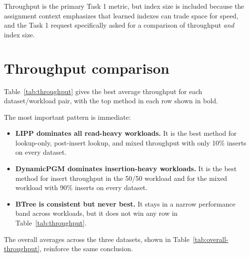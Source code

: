 \documentclass[11pt]{article}
\begin{document}
Throughput is the primary Task 1 metric, but index size is included because the
assignment context emphasizes that learned indexes can trade space for speed, and the
Task 1 request specifically asked for a comparison of throughput \emph{and} index size.

\section{Throughput comparison}

Table~\ref{tab:throughput} gives the best average throughput for each dataset/workload
pair, with the top method in each row shown in bold.

\begin{table}[H]
    \centering
    \caption{Best average throughput (Mops/s) from the committed Task 1 results.}
    \label{tab:throughput}
    \small
    
\end{table}

The most important pattern is immediate:
\begin{itemize}[leftmargin=1.5em]
    \item \textbf{LIPP dominates all read-heavy workloads.} It is the best method for
    lookup-only, post-insert lookup, and mixed throughput with only 10\% inserts on
    every dataset.
    \item \textbf{DynamicPGM dominates insertion-heavy workloads.} It is the best method
    for insert throughput in the 50/50 workload and for the mixed workload with 90\%
    inserts on every dataset.
    \item \textbf{BTree is consistent but never best.} It stays in a narrow performance
    band across workloads, but it does not win any row in Table~\ref{tab:throughput}.
\end{itemize}

The overall averages across the three datasets, shown in
Table~\ref{tab:overall-throughput}, reinforce the same conclusion.

\begin{table}[H]
    \centering
    \caption{Overall average throughput across the three datasets.}
    \label{tab:overall-throughput}
    \small
    
\end{table}
\end{document}
